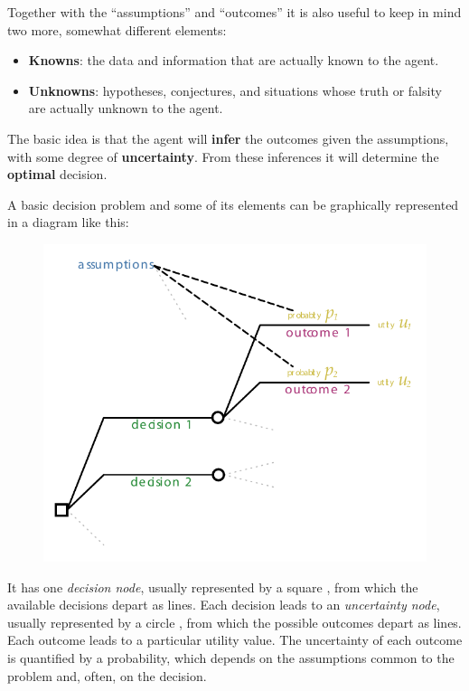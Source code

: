 \documentclass[
  a4paper,
  DIV=11,
  numbers=noendperiod,
  oneside]{scrreprt}
\begin{document}
Together with the ``assumptions'' and ``outcomes'' it is also useful to
keep in mind two more, somewhat different elements:

\begin{itemize}
\item
  {\textbf{Knowns}}: the data and information that are actually known to
  the agent.
\item
  {\textbf{Unknowns}}: hypotheses, conjectures, and situations whose
  truth or falsity are actually unknown to the agent.
\end{itemize}

The basic idea is that the agent will {\textbf{infer}} the outcomes
given the assumptions, with some degree of {\textbf{uncertainty}}. From
these inferences it will determine the {\textbf{optimal}} decision.

A basic decision problem and some of its elements can be graphically
represented in a diagram like this:

\begin{figure}

{\centering \includegraphics[width=1\textwidth,height=\textheight]{index_files/mediabag/decision_tree.pdf}

}

\end{figure}

It has one \emph{decision node}, usually represented by a square
, from which the available decisions depart as lines.
Each decision leads to an \emph{uncertainty node}, usually represented
by a circle , from which the possible outcomes depart as
lines. Each outcome leads to a particular utility value. The uncertainty
of each outcome is quantified by a probability, which depends on the
assumptions common to the problem and, often, on the decision.
\end{document}

